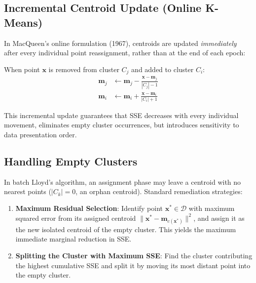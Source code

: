 \subsection{Incremental Centroid Update (Online K-Means)}

In MacQueen's online formulation (1967), centroids are updated \textit{immediately} after every individual point reassignment, rather than at the end of each epoch:
\begin{property}
When point $\mathbf{x}$ is removed from cluster $C_j$ and added to cluster $C_i$:
\begin{align}
    \mathbf{m}_j &\leftarrow \mathbf{m}_j - \frac{\mathbf{x} - \mathbf{m}_j}{|C_j| - 1} \label{eq:dm-macqueen-remove-en} \\
    \mathbf{m}_i &\leftarrow \mathbf{m}_i + \frac{\mathbf{x} - \mathbf{m}_i}{|C_i| + 1} \label{eq:dm-macqueen-add-en}
\end{align}
\end{property}
This incremental update guarantees that SSE decreases with every individual movement, eliminates empty cluster occurrences, but introduces sensitivity to data presentation order.

\subsection{Handling Empty Clusters}

In batch Lloyd's algorithm, an assignment phase may leave a centroid with no nearest points ($|C_k| = 0$, an orphan centroid).
Standard remediation strategies:
\begin{enumerate}
    \item \textbf{Maximum Residual Selection}: Identify point $\mathbf{x}^* \in \mathcal{D}$ with maximum squared error from its assigned centroid $\|\mathbf{x}^* - \mathbf{m}_{c(\mathbf{x}^*)}\|^2$, and assign it as the new isolated centroid of the empty cluster. This yields the maximum immediate marginal reduction in SSE.
    \item \textbf{Splitting the Cluster with Maximum SSE}: Find the cluster contributing the highest cumulative SSE and split it by moving its most distant point into the empty cluster.
\end{enumerate}

